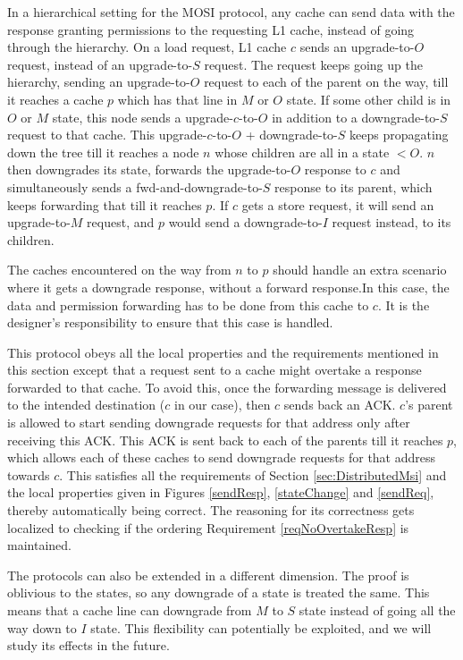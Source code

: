 In a hierarchical setting for the MOSI protocol, any cache can send data
with the response granting permissions to the requesting L1 cache, instead of
going through the hierarchy.  On a load request, L1 cache $c$ sends an
upgrade-to-$O$ request, instead of an upgrade-to-$S$ request. The request keeps
going up the hierarchy, sending an upgrade-to-$O$ request to each of the parent
on the way, till it reaches a cache $p$ which has that line in $M$ or $O$
state. If some other child is in $O$ or $M$ state, this node sends a
upgrade-$c$-to-$O$ in addition to a downgrade-to-$S$ request to that cache.
This upgrade-$c$-to-$O$ + downgrade-to-$S$ keeps propagating down the tree till
it reaches a node $n$ whose children are all in a state $< O$. $n$ then
downgrades its state, forwards the upgrade-to-$O$ response to $c$ and
simultaneously sends a fwd-and-downgrade-to-$S$ response to its parent, which
keeps forwarding that till it reaches $p$. If $c$ gets a store request, it will
send an upgrade-to-$M$ request, and $p$ would send a downgrade-to-$I$ request
instead, to its children.

The caches encountered on the way from $n$ to $p$ should handle an extra
scenario where it gets a downgrade response, without a forward response.In this
case, the data and permission forwarding has to be done from this cache to $c$.
It is the designer's responsibility to ensure that this case is handled. 

This protocol obeys all the local properties and the requirements mentioned in
this section except that a request sent to a cache might overtake a response
forwarded to that cache. To avoid this, once the forwarding message is
delivered to the intended destination ($c$ in our case), then $c$ sends back an
ACK. $c$'s parent is allowed to start sending downgrade requests for that
address only after receiving this ACK. This ACK is sent back to each of the
parents till it reaches $p$, which allows each of these caches to send
downgrade requests for that address towards $c$.  This satisfies all the
requirements of Section \ref{sec:DistributedMsi} and the local properties given in
Figures \ref{sendResp}, \ref{stateChange} and \ref{sendReq}, thereby automatically being correct. The reasoning for
its correctness gets localized to checking if the ordering Requirement
\ref{reqNoOvertakeResp} is maintained.

The protocols can also be extended in a different dimension. The proof is
oblivious to the states, so any downgrade of a state is treated the same. This
means that a cache line can downgrade from $M$ to $S$ state instead of going all
the way down to $I$ state. This flexibility can potentially be exploited, and we
will study its effects in the future.
